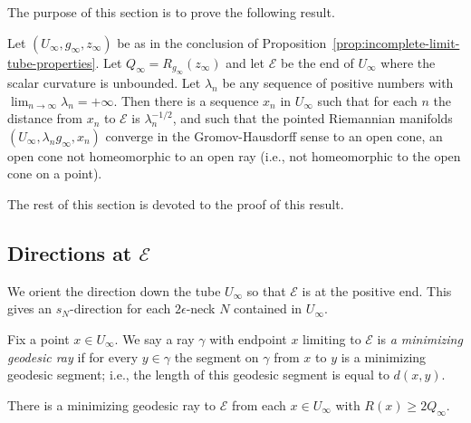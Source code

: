 The purpose of this section is to prove the following result.

\begin{proposition}
\label{prop:cone-limit-gromov-hausdorff}
\label{statement}

Let $(U_\infty,g_\infty,z_\infty)$  be as in the conclusion of
Proposition~\ref{prop:incomplete-limit-tube-properties}. Let $Q_\infty=R_{g_\infty}(z_\infty)$ and
let ${\mathcal E}$ be the end of $U_\infty$ where the scalar
curvature is unbounded. Let $\lambda_n$ be any sequence of positive
numbers with $\lim_{n\rightarrow\infty}\lambda_n=+\infty$. Then
there is a sequence $x_n$ in $U_\infty$ such that for each $n$ the
distance from $x_n$ to ${\mathcal E}$ is $\lambda_n^{-1/2}$, and
such that the pointed Riemannian manifolds
$(U_\infty,\lambda_ng_\infty,x_n)$ converge in the Gromov-Hausdorff
sense to an open cone, an open cone not homeomorphic to
an open ray (i.e., not homeomorphic to the open cone on a point).
\end{proposition}

The rest of this section is devoted to the proof of this result.

\subsection{Directions at ${\mathcal E}$}

 We orient the direction down the tube $U_\infty$ so that
${\mathcal E}$ is at the positive end. This gives an $s_N$-direction
for each $2\epsilon$-neck $N$ contained in $U_\infty$.




Fix a point $x\in U_\infty$. We say a ray $\gamma$ with endpoint $x$
limiting to ${\mathcal E}$ is {\sl a minimizing geodesic ray} if for
every $y\in \gamma$ the segment on $\gamma$ from $x$ to $y$ is a
minimizing geodesic segment; i.e., the length of this geodesic
segment is equal to $d(x,y)$.

\begin{claim}
\label{claim:minimizing-ray-to-end-exists}

There is a minimizing geodesic ray to ${\mathcal E}$ from each $x\in
U_\infty$ with $R(x)\ge 2Q_\infty$.
\end{claim}

